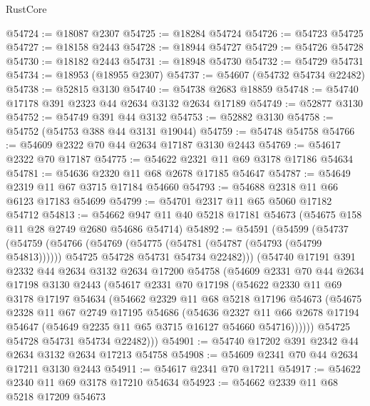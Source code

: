 \begin{lexlean}{RustCore}
\begin{coremodule}
@54724 := @18087 @2307
@54725 := @18284 @54724
@54726 := @54723 @54725
@54727 := @18158 @2443
@54728 := @18944 @54727
@54729 := @54726 @54728
@54730 := @18182 @2443
@54731 := @18948 @54730
@54732 := @54729 @54731
@54734 := @18953 (@18955 @2307)
@54737 := @54607 (@54732 @54734 @22482)
@54738 := @52815 @3130
@54740 := @54738 @2683 @18859
@54748 := @54740 @17178 @391 @2323 @44 @2634 @3132 @2634 @17189
@54749 := @52877 @3130
@54752 := @54749 @391 @44 @3132
@54753 := @52882 @3130
@54758 := @54752 (@54753 @388 @44 @3131 @19044)
@54759 := @54748 @54758
@54766 := @54609 @2322 @70 @44 @2634 @17187 @3130 @2443
@54769 := @54617 @2322 @70 @17187
@54775 := @54622 @2321 @11 @69 @3178 @17186 @54634
@54781 := @54636 @2320 @11 @68 @2678 @17185 @54647
@54787 := @54649 @2319 @11 @67 @3715 @17184 @54660
@54793 := @54688 @2318 @11 @66 @6123 @17183 @54699
@54799 := @54701 @2317 @11 @65 @5060 @17182 @54712
@54813 := @54662 @947 @11 @40 @5218 @17181 @54673 (@54675 @158 @11 @28 @2749 @2680 @54686 @54714)
@54892 := @54591
    (@54599
      (@54737
        (@54759
          (@54766
            (@54769 (@54775 (@54781 (@54787 (@54793 (@54799 @54813))))))
            @54725
            @54728
            @54731
            @54734
            @22482)))
      (@54740
        @17191
        @391
        @2332
        @44
        @2634
        @3132
        @2634
        @17200
        @54758
        (@54609
          @2331
          @70
          @44
          @2634
          @17198
          @3130
          @2443
          (@54617
            @2331
            @70
            @17198
            (@54622
              @2330
              @11
              @69
              @3178
              @17197
              @54634
              (@54662
                @2329
                @11
                @68
                @5218
                @17196
                @54673
                (@54675
                  @2328
                  @11
                  @67
                  @2749
                  @17195
                  @54686
                  (@54636
                    @2327
                    @11
                    @66
                    @2678
                    @17194
                    @54647
                    (@54649 @2235 @11 @65 @3715 @16127 @54660 @54716))))))
          @54725
          @54728
          @54731
          @54734
          @22482)))
@54901 := @54740 @17202 @391 @2342 @44 @2634 @3132 @2634 @17213 @54758
@54908 := @54609 @2341 @70 @44 @2634 @17211 @3130 @2443
@54911 := @54617 @2341 @70 @17211
@54917 := @54622 @2340 @11 @69 @3178 @17210 @54634
@54923 := @54662 @2339 @11 @68 @5218 @17209 @54673

\end{coremodule}
\end{lexlean}
